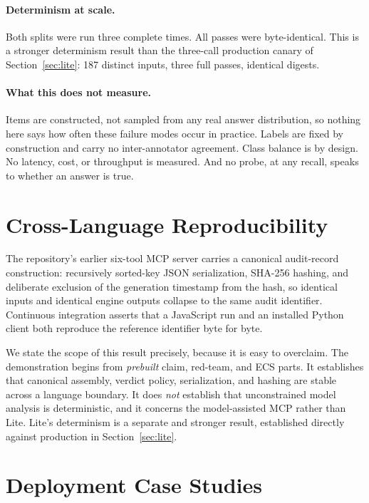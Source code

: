 \paragraph{Determinism at scale.}
Both splits were run three complete times. All passes were byte-identical. This is a
stronger determinism result than the three-call production canary of
Section~\ref{sec:lite}: 187 distinct inputs, three full passes, identical digests.

\paragraph{What this does not measure.}
Items are constructed, not sampled from any real answer distribution, so nothing here
says how often these failure modes occur in practice. Labels are fixed by construction
and carry no inter-annotator agreement. Class balance is by design. No latency, cost, or
throughput is measured. And no probe, at any recall, speaks to whether an answer is true.

\section{Cross-Language Reproducibility}
\label{sec:crosslang}

The repository's earlier six-tool MCP server carries a canonical audit-record
construction: recursively sorted-key JSON serialization, SHA-256 hashing, and deliberate
exclusion of the generation timestamp from the hash, so identical inputs and identical
engine outputs collapse to the same audit identifier. Continuous integration asserts that
a JavaScript run and an installed Python client both reproduce the reference identifier
 byte for byte.

We state the scope of this result precisely, because it is easy to overclaim. The
demonstration begins from \emph{prebuilt} claim, red-team, and ECS parts. It establishes
that canonical assembly, verdict policy, serialization, and hashing are stable across a
language boundary. It does \emph{not} establish that unconstrained model analysis is
deterministic, and it concerns the model-assisted MCP rather than Lite. Lite's determinism
is a separate and stronger result, established directly against production in
Section~\ref{sec:lite}.

\section{Deployment Case Studies}

